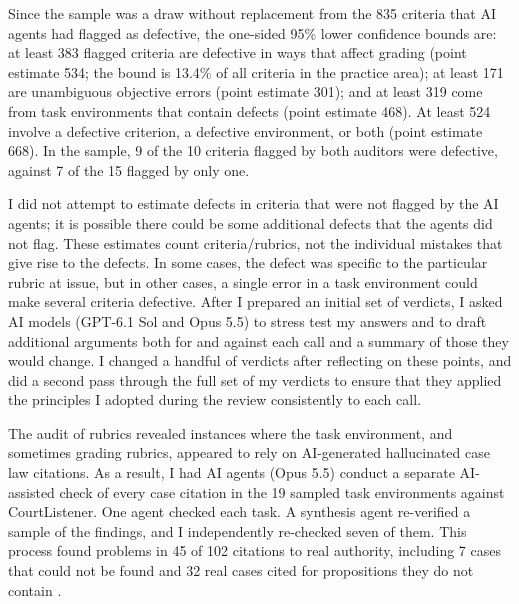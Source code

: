 \documentclass[11pt]{article}
\newcommand{\labFlagged}{835}
\newcommand{\labSampleTasks}{19}
\newcommand{\labBothFlagged}{10}
\newcommand{\labBothDefective}{9}
\newcommand{\labSingleFlagged}{15}
\newcommand{\labSingleDefective}{7}
\newcommand{\labDefectiveLB}{383}
\newcommand{\labDefectivePoint}{534}
\newcommand{\labDefectiveShare}{13.4}
\newcommand{\labObjectiveLB}{171}
\newcommand{\labObjectivePoint}{301}
\newcommand{\labEnvLB}{319}
\newcommand{\labEnvPoint}{468}
\newcommand{\labAnyLB}{524}
\newcommand{\labAnyPoint}{668}
\begin{document}
Since the sample was a draw without replacement from the \labFlagged{} criteria that AI agents had flagged as defective, the one-sided 95\% lower confidence bounds are: at least \labDefectiveLB{} flagged criteria are defective in ways that affect grading (point estimate \labDefectivePoint{}; the bound is \labDefectiveShare\% of all criteria in the practice area); at least \labObjectiveLB{} are unambiguous objective errors (point estimate \labObjectivePoint{}); and at least \labEnvLB{} come from task environments that contain defects (point estimate \labEnvPoint{}). At least \labAnyLB{} involve a defective criterion, a defective environment, or both (point estimate \labAnyPoint{}). In the sample, \labBothDefective{} of the \labBothFlagged{} criteria flagged by both auditors were defective, against \labSingleDefective{} of the \labSingleFlagged{} flagged by only one.

I did not attempt to estimate defects in criteria that were not flagged by the AI agents; it is possible there could be some additional defects that the agents did not flag. These estimates count criteria/rubrics, not the individual mistakes that give rise to the defects. In some cases, the defect was specific to the particular rubric at issue, but in other cases, a single error in a task environment could make several criteria defective. After I prepared an initial set of verdicts, I asked AI models (GPT-6.1 Sol and Opus 5.5) to stress test my answers and to draft additional arguments both for and against each call and a summary of those they would change. I changed a handful of verdicts after reflecting on these points, and did a second pass through the full set of my verdicts to ensure that they applied the principles I adopted during the review consistently to each call.

The audit of rubrics revealed instances where the task environment, and sometimes grading rubrics, appeared to rely on AI-generated hallucinated case law citations. As a result, I had AI agents (Opus 5.5) conduct a separate AI-assisted check of every case citation in the \labSampleTasks{} sampled task environments against CourtListener. One agent checked each task. A synthesis agent re-verified a sample of the findings, and I independently re-checked seven of them. This process found problems in 45 of 102 citations to real authority, including 7 cases that could not be found and 32 real cases cited for propositions they do not contain \citep{labreview}.
\end{document}
